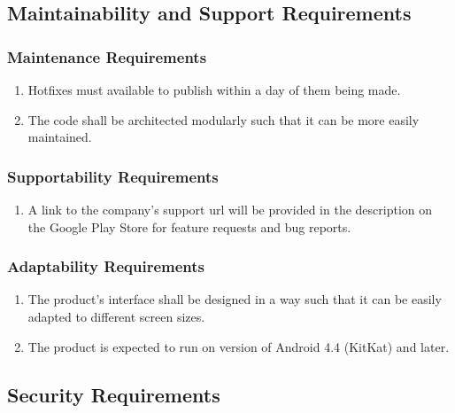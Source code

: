 \documentclass[]{article}
\begin{document}

\subsection{Maintainability and Support Requirements}
\label{sub:maintainability_and_support_requirements}

\subsubsection{Maintenance Requirements}
\label{ssub:maintenance_requirements}
\begin{enumerate}[{MS}1. ]
	\item Hotfixes must available to publish within a day of them being made.
	\item The code shall be architected modularly such that it can be more easily maintained.
	\holdEnum
\end{enumerate}

\subsubsection{Supportability Requirements}
\label{ssub:supportability_requirements}
\begin{enumerate}[{MS}1. ]
	\resumeEnum
	\item A link to the company's support url will be provided in the description on the Google Play Store for feature requests and bug reports.
	\holdEnum
\end{enumerate}

\subsubsection{Adaptability Requirements}
\label{ssub:adaptability_requirements}
\begin{enumerate}[{MS}1. ]
	\resumeEnum
	\item The product's interface shall be designed in a way such that it can be easily adapted to different screen sizes.
	\item The product is expected to run on version of Android 4.4 (KitKat) and later.
\end{enumerate}


\subsection{Security Requirements}
\label{sub:security_requirements}
\end{document}
